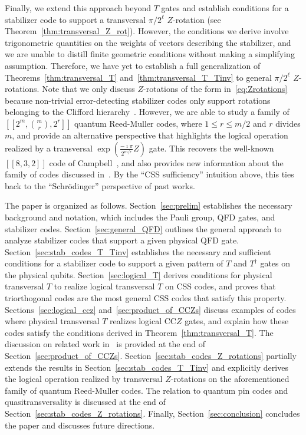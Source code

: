 \documentclass[twoside,romanappendices]{IEEEtran}
\newcommand{\llbr}{[\![}
\newcommand{\rrbr}{]\!]}
\begin{document}
Finally, we extend this approach beyond $T$ gates and establish conditions for a stabilizer code to support a transversal $\pi/2^{\ell}$ $Z$-rotation (see Theorem~\ref{thm:transversal_Z_rot}).
However, the conditions we derive involve trigonometric quantities on the weights of vectors describing the stabilizer, and we are unable to distill finite geometric conditions without making a simplifying assumption.
Therefore, we have yet to establish a full generalization of Theorems~\ref{thm:transversal_T} and~\ref{thm:transversal_T_Tinv} to general $\pi/2^{\ell}$ $Z$-rotations.
Note that we only discuss $Z$-rotations of the form in~\eqref{eq:Zrotations} because non-trivial error-detecting stabilizer codes only support rotations belonging to the Clifford hierarchy~\cite{JochymOconnor-prx17,Cui-physreva17}.
However, we are able to study a family of $\llbr 2^m, \binom{m}{r}, 2^r \rrbr$ quantum Reed-Muller codes, where $1 \leq r \leq m/2$ and $r$ divides $m$, and provide an alternative perspective that highlights the logical operation realized by a transversal $\exp\left( \frac{-\imath\pi}{2^{m/r}} Z \right)$ gate.
This recovers the well-known $\llbr 8,3,2 \rrbr$ code of Campbell~\cite{Campbell-blog16}, and also provides new information about the family of codes discussed in~\cite{Haah-quantum17b,Campbell-pra17}.
By the ``CSS sufficiency'' intuition above, this ties back to the ``Schr{\"o}dinger'' perspective of past works.

The paper is organized as follows.
Section~\ref{sec:prelim} establishes the necessary background and notation, which includes the Pauli group, QFD gates, and stabilizer codes. %
Section~\ref{sec:general_QFD} outlines the general approach to analyze stabilizer codes that support a given physical QFD gate.
Section~\ref{sec:stab_codes_T_Tinv} establishes the necessary and sufficient conditions for a stabilizer code to support a given pattern of $T$ and $T^{\dagger}$ gates on the physical qubits.
Section~\ref{sec:logical_T} derives conditions for physical transversal $T$ to realize logical transversal $T$ on CSS codes, and proves that triorthogonal codes are the most general CSS codes that satisfy this property.
Sections~\ref{sec:logical_ccz} and~\ref{sec:product_of_CCZs} discuss examples of codes where physical transversal $T$ realizes logical $\text{CC}Z$ gates, and explain how these codes satisfy the conditions derived in Theorem~\ref{thm:transversal_T}.
The discussion on related work in~\cite{Haah-quantum17b} is provided at the end of Section~\ref{sec:product_of_CCZs}.
Section~\ref{sec:stab_codes_Z_rotations} partially extends the results in Section~\ref{sec:stab_codes_T_Tinv} and explicitly derives the logical operation realized by transversal $Z$-rotations on the aforementioned family of quantum Reed-Muller codes.
The relation to quantum pin codes and quasitransversality is discussed at the end of Section~\ref{sec:stab_codes_Z_rotations}.
Finally, Section~\ref{sec:conclusion} concludes the paper and discusses future directions.
\end{document}
